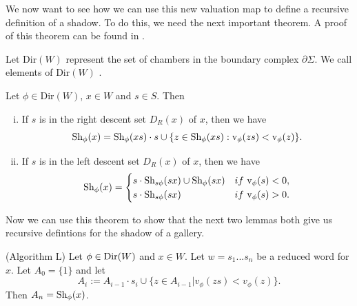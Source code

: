 \documentclass[11pt]{article}
\begin{document}
We now want to see how we can use this new valuation map to define a recursive definition of a shadow. To do this, we need the next important theorem. A proof of this theorem can be found in \cite[pp.142-143]{SHA}. 

Let Dir$(W)$ represent the set of chambers in the boundary complex $\partial\Sigma$. We call elements of Dir$(W)$ . 

\begin{theorem} \label{alg}
    Let $\phi\in$Dir$(W)$, $x\in W$ and $s\in S$. Then
    \begin{enumerate}[(i)]
        \item If $s$ is in the right descent set $D_R(x)$ of $x$, then we have
        \[\textnormal{Sh}_\phi(x)=\textnormal{Sh}_\phi(xs)\cdot s \cup \{z\in \textnormal{Sh}_\phi(xs):\textnormal{v}_\phi(zs)<\textnormal{v}_\phi(z)\}.\]
        \item If $s$ is in the left descent set $D_R(x)$ of $x$, then we have
        \[\textnormal{Sh}_\phi(x)=\begin{cases}
            s\cdot \textnormal{Sh}_{s\phi}(sx)\cup \textnormal{Sh}_\phi(sx) &if\textnormal{ v}_\phi(s)<0,\\
            s\cdot \textnormal{Sh}_{s\phi}(sx) &if \textnormal{ v}_\phi(s)>0.\\
        \end{cases}\]
    \end{enumerate}
\end{theorem}



Now we can use this theorem to show that the next two lemmas both give us recursive defintions for the shadow of a gallery. 

\begin{lemma} (Algorithm L)
    Let $\phi\in\textnormal{Dir}(W)$ and $x\in W$. Let $w=s_1...s_n$ be a reduced word for $x$. Let $A_0=\{1\}$ and let
    \[A_i:=A_{i-1}\cdot s_i\cup \{z\in A_{i-1}|v_\phi(zs)<v_\phi(z)\}.\]
    Then $A_n=\textnormal{Sh}_\phi(x)$. 
\end{lemma}
\end{document}

